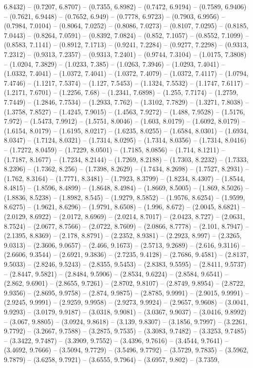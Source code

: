 6.8432) -- (0.7207, 6.8707) -- (0.7355, 6.8982) -- (0.7472, 6.9194) -- (0.7589, 6.9406) -- (0.7621, 6.9448) -- (0.7652, 6.949) -- (0.7778, 6.9723) -- (0.7903, 6.9956) -- (0.7984, 7.0104) -- (0.8064, 7.0252) -- (0.8086, 7.0273) -- (0.8107, 7.0295) -- (0.8185, 7.0443) -- (0.8264, 7.0591) -- (0.8392, 7.0824) -- (0.852, 7.1057) -- (0.8552, 7.1099) -- (0.8583, 7.1141) -- (0.8912, 7.1713) -- (0.9241, 7.2284) -- (0.9277, 7.2298) -- (0.9313, 7.2312) -- (0.9313, 7.2357) -- (0.9313, 7.2401) -- (0.9744, 7.3104) -- (1.0175, 7.3808) -- (1.0204, 7.3829) -- (1.0233, 7.385) -- (1.0263, 7.3946) -- (1.0293, 7.4041) -- (1.0332, 7.4041) -- (1.0372, 7.4041) -- (1.0372, 7.4079) -- (1.0372, 7.4117) -- (1.0794, 7.4746) -- (1.1217, 7.5374) -- (1.127, 7.5453) -- (1.1324, 7.5532) -- (1.1747, 7.6117) -- (1.2171, 7.6701) -- (1.2256, 7.68) -- (1.2341, 7.6898) -- (1.255, 7.7174) -- (1.2759, 7.7449) -- (1.2846, 7.7534) -- (1.2933, 7.762) -- (1.3102, 7.7829) -- (1.3271, 7.8038) -- (1.3758, 7.8527) -- (1.4245, 7.9015) -- (1.4563, 7.9272) -- (1.488, 7.9528) -- (1.5176, 7.972) -- (1.5473, 7.9912) -- (1.5751, 8.0046) -- (1.603, 8.0179) -- (1.6092, 8.0179) -- (1.6154, 8.0179) -- (1.6195, 8.0217) -- (1.6235, 8.0255) -- (1.6584, 8.0301) -- (1.6934, 8.0347) -- (1.7124, 8.0321) -- (1.7314, 8.0295) -- (1.7314, 8.0356) -- (1.7314, 8.0416) -- (1.7272, 8.0459) -- (1.7229, 8.0501) -- (1.7185, 8.0856) -- (1.714, 8.1211) -- (1.7187, 8.1677) -- (1.7234, 8.2144) -- (1.7269, 8.2188) -- (1.7303, 8.2232) -- (1.7333, 8.2396) -- (1.7362, 8.256) -- (1.7398, 8.2629) -- (1.7434, 8.2698) -- (1.7527, 8.2931) -- (1.762, 8.3164) -- (1.7771, 8.3481) -- (1.7923, 8.3799) -- (1.8234, 8.4307) -- (1.8544, 8.4815) -- (1.8596, 8.4899) -- (1.8648, 8.4984) -- (1.8669, 8.5005) -- (1.869, 8.5026) -- (1.8836, 8.5238) -- (1.8982, 8.545) -- (1.9279, 8.5852) -- (1.9576, 8.6254) -- (1.9599, 8.6275) -- (1.9621, 8.6296) -- (1.9791, 8.6508) -- (1.996, 8.672) -- (2.0045, 8.6821) -- (2.0129, 8.6922) -- (2.0172, 8.6969) -- (2.0214, 8.7017) -- (2.0423, 8.727) -- (2.0631, 8.7524) -- (2.0677, 8.7566) -- (2.0722, 8.7609) -- (2.0866, 8.7778) -- (2.101, 8.7947) -- (2.1395, 8.8369) -- (2.178, 8.8791) -- (2.2352, 8.9381) -- (2.2923, 8.997) -- (2.3265, 9.0313) -- (2.3606, 9.0657) -- (2.466, 9.1673) -- (2.5713, 9.2689) -- (2.616, 9.3116) -- (2.6606, 9.3544) -- (2.6921, 9.3836) -- (2.7235, 9.4128) -- (2.7686, 9.4581) -- (2.8137, 9.5033) -- (2.8246, 9.5243) -- (2.8355, 9.5453) -- (2.8383, 9.5595) -- (2.8411, 9.5737) -- (2.8447, 9.5821) -- (2.8484, 9.5906) -- (2.8534, 9.6224) -- (2.8584, 9.6541) -- (2.862, 9.6901) -- (2.8655, 9.7261) -- (2.8702, 9.8107) -- (2.8749, 9.8954) -- (2.8722, 9.9356) -- (2.8695, 9.9758) -- (2.874, 9.9875) -- (2.8785, 9.9991) -- (2.9015, 9.9991) -- (2.9245, 9.9991) -- (2.9259, 9.9958) -- (2.9273, 9.9924) -- (2.9657, 9.9608) -- (3.0041, 9.9293) -- (3.0179, 9.9187) -- (3.0318, 9.9081) -- (3.0367, 9.9037) -- (3.0416, 9.8992) -- (3.067, 9.8805) -- (3.0924, 9.8618) -- (3.139, 9.8307) -- (3.1856, 9.7997) -- (3.2261, 9.7792) -- (3.2667, 9.7588) -- (3.2875, 9.7535) -- (3.3083, 9.7482) -- (3.3253, 9.7485) -- (3.3422, 9.7487) -- (3.3909, 9.7552) -- (3.4396, 9.7616) -- (3.4544, 9.7641) -- (3.4692, 9.7666) -- (3.5094, 9.7729) -- (3.5496, 9.7792) -- (3.5729, 9.7835) -- (3.5962, 9.7879) -- (3.6258, 9.7921) -- (3.6555, 9.7964) -- (3.6957, 9.802) -- (3.7359, 